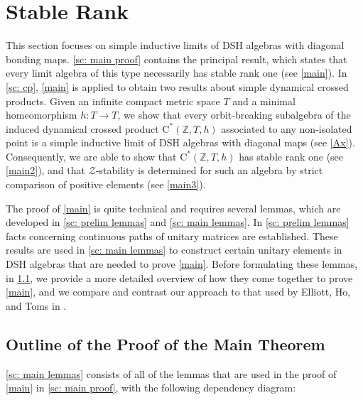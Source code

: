 \documentclass[12pt]{amsart}
\numberwithin{equation}{section}
\theoremstyle{definition}
\theoremstyle{remark}
\begin{document}
\section{Stable Rank}
\label{ch: stable rank}

This section focuses on simple inductive limits of DSH algebras with diagonal bonding maps. \cref{sc: main proof} contains the principal result, which states that every limit algebra of this type necessarily has stable rank one (see \autoref{main}). In \cref{sc: cp}, \autoref{main} is applied to obtain two results about simple dynamical crossed products. Given an infinite compact metric space $T$ and a minimal homeomorphism $h\colon T\to T$, we show that every orbit-breaking subalgebra of the induced dynamical crossed product $\mathrm{C}^{*}(\mathbb{Z},T,h)$ associated to any non-isolated point is a simple inductive limit of DSH algebras with diagonal maps (see \autoref{Ax}). Consequently, we are able to show that $\mathrm{C}^{*}(\mathbb{Z},T,h)$ has stable rank one (see \autoref{main2}), and that $\mathcal{Z}$-stability is determined for such an algebra by strict comparison of positive elements (see \autoref{main3}). 

The proof of \autoref{main} is quite technical and requires several lemmas, which are developed in \cref{sc: prelim lemmas} and \cref{sc: main lemmas}. In \cref{sc: prelim lemmas} facts concerning continuous paths of unitary matrices are established. These results are used in \cref{sc: main lemmas} to construct certain unitary elements in DSH algebras that are needed to prove \autoref{main}. Before formulating these lemmas, in \cref{sc: outline of proof}, we provide a more detailed overview of how they come together to prove \autoref{main}, and we compare and contrast our approach to that used by Elliott, Ho, and Toms in \cite{EHT}.




\subsection{Outline of the Proof of the Main Theorem}
\label{sc: outline of proof}

\cref{sc: main lemmas} consists of all of the lemmas that are used in the proof of \autoref{main} in \cref{sc: main proof}, with the following dependency diagram:

\begin{figure}[omitted: a diagram of this paper's results, not reproduced here]\label{chart}\end{figure}
\end{document}

